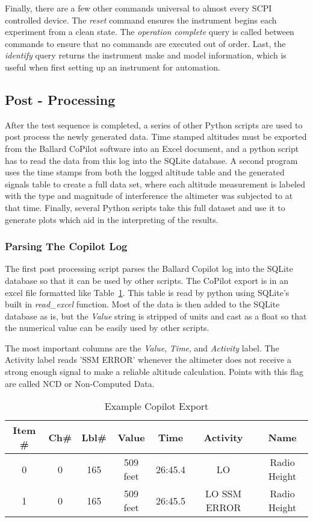 Finally, there are a few other commands universal to almost every SCPI controlled device. The \textit{reset} command ensures the instrument begins each experiment from a clean state. The \textit{operation complete} query is called between commands to ensure that no commands are executed out of order. Last, the \textit{identify} query returns the instrument make and model information, which is useful when first setting up an instrument for automation. 

\subsection{Post - Processing}
After the test sequence is completed, a series of other Python scripts are used to post process the newly generated data. Time stamped altitudes must be exported from the Ballard CoPilot software into an Excel document, and a python script has to read the data from this log into the SQLite database. A second program uses the time stamps from both the logged altitude table and the generated signals table to create a full data set, where each altitude measurement is labeled with the type and magnitude of interference the altimeter was subjected to at that time. Finally, several Python scripts take this full dataset and use it to generate plots which aid in the interpreting of the results. 
\subsubsection{Parsing The Copilot Log}
The first post processing script parses the Ballard Copilot log into the SQLite database so that it can be used by other scripts. The CoPilot export is in an excel file formatted like Table~\ref{tab:Copilot}. This table is read by python using SQLite's built in \textit{read\_excel} function. Most of the data is then added to the SQLite database as is, but the \textit{Value} string is stripped of units and cast as a float so that the numerical value can be easily used by other scripts. 

The most important columns are the \textit{Value}, \textit{Time}, and \textit{Activity} label. The Activity label reads 'SSM ERROR'  whenever the altimeter does not receive a strong enough signal to make a reliable altitude calculation. Points with this flag are called NCD or Non-Computed Data. 
\begin{table}[]
\centering
\begin{tabular}{ccccccc}

\hline
Item \# & Ch\# & Lbl\# & Value    & Time    & Activity      & Name         \\ \hline
0       & 0    & 165   & 509 feet & 26:45.4 & LO            & Radio Height \\
1       & 0    & 165   & 509 feet & 26:45.5 & LO SSM ERROR & Radio Height \\ \hline
\end{tabular}
\caption{Example Copilot Export}
\label{tab:Copilot}
\end{table}
